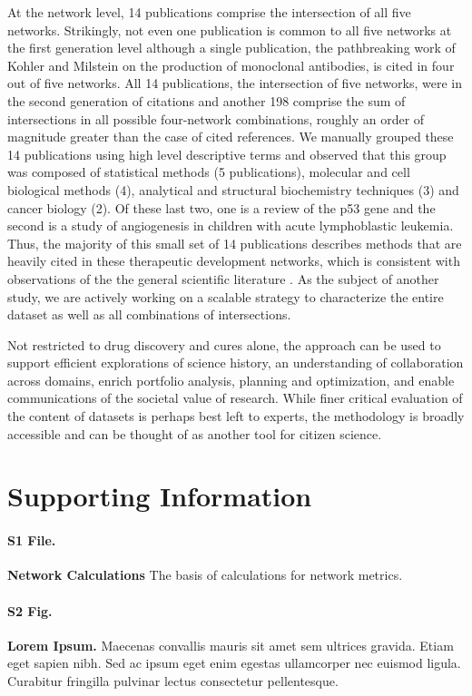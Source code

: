\documentclass[10pt,letterpaper]{article}
\begin{document}
At the network level, 14 publications comprise the intersection of all five networks. Strikingly, not even one publication is common to all five networks at the first generation level although a single publication, the pathbreaking work of Kohler and Milstein on the production of monoclonal antibodies\cite{bibKohler}, is cited in four out of five networks. All 14 publications, the intersection of five networks, were in the second generation of citations and another 198 comprise the sum of intersections in all possible four-network combinations, roughly an order of magnitude greater than the case of cited references.  We manually grouped these 14 publications using high level descriptive terms and observed that this group was composed of  statistical methods (5 publications), molecular and cell biological methods (4), analytical and structural biochemistry techniques (3) and cancer biology (2). Of these last two, one is a review of the p53 gene\cite{bibLevine} and the second is a study of angiogenesis in children with acute lymphoblastic leukemia\cite{bibFolkman}. Thus, the majority of this small set of 14 publications describes methods that are heavily cited in these therapeutic development networks, which is consistent with observations of the the general scientific literature \cite{bibVanNoorden}. As the subject of another study, we are actively working on a scalable strategy to characterize the entire dataset as well as all combinations of intersections. 

Not restricted to  drug discovery and cures alone, the approach can be used to support efficient explorations of science history, an understanding of collaboration across domains, enrich portfolio analysis, planning and optimization, and enable communications of the societal value of research. While finer critical evaluation of the content of datasets is perhaps best left to experts, the methodology is broadly accessible and can be thought of as another tool for citizen science.

\section*{Supporting Information}

\paragraph*{S1 File.}
\label{S1_File}
{\bf Network Calculations} The basis of calculations for network metrics.

\paragraph*{S2 Fig.}
\label{S2_Fig}
{\bf Lorem Ipsum.} Maecenas convallis mauris sit amet sem ultrices gravida. Etiam eget sapien nibh. Sed ac ipsum eget enim egestas ullamcorper nec euismod ligula. Curabitur fringilla pulvinar lectus consectetur pellentesque.
\end{document}
